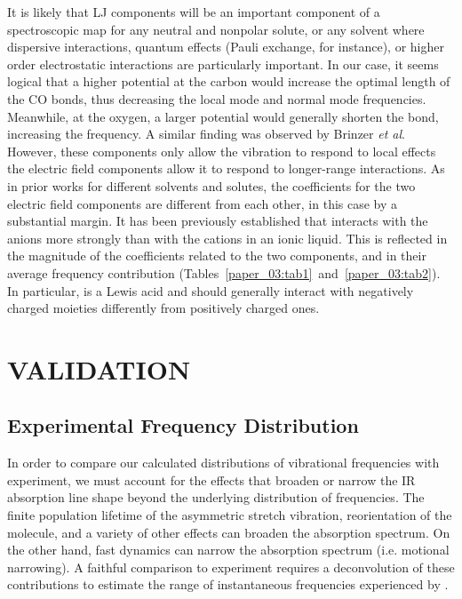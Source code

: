 \documentclass[%
  class = book,%
  crop = false,%
  float = true,%
  multi = true,%
  preview = false,%
]{standalone}
\newcommand{\caps}[1]{\uppercase{#1}}
\begin{document}
It is likely that LJ components will be an important component of a spectroscopic map for any neutral and nonpolar solute, or any solvent where dispersive interactions, quantum effects (Pauli exchange, for instance), or higher order electrostatic interactions are particularly important. In our case, it seems logical that a higher potential at the carbon would increase the optimal length of the CO bonds, thus decreasing the local mode and normal mode frequencies. Meanwhile, at the oxygen, a larger potential would generally shorten the bond, increasing the frequency. A similar finding was observed by Brinzer \emph{et al}.\cite{Brinzer2015} However, these components only allow the  vibration to respond to local effects \textemdash{} the electric field components allow it to respond to longer-range interactions. As in prior works for different solvents and solutes, the coefficients for the two electric field components are different from each other, in this case by a substantial margin. It has been previously established that  interacts with the anions more strongly than with the cations in an ionic liquid.\cite{Cadena2004,akiJPCB-04,anthonyJPCB-05,Muldoon2007a,houIECR-07,ramdinIECR-12} This is reflected in the magnitude of the coefficients related to the two components, and in their average frequency contribution (Tables~\ref{paper_03:tab1}~and~\ref{paper_03:tab2}). In particular,  is a Lewis acid and should generally interact with negatively charged moieties differently from positively charged ones.

\section{\texorpdfstring{\caps{Validation}}{Validation}}
\label{paper_03:sec:V}

\subsection{Experimental Frequency Distribution}
\label{paper_03:ssec:V-A}

In order to compare our calculated distributions of  vibrational frequencies with experiment, we must account for the effects that broaden or narrow the IR absorption line shape beyond the underlying distribution of frequencies. The finite population lifetime of the asymmetric stretch vibration, reorientation of the  molecule, and a variety of other effects can broaden the absorption spectrum. On the other hand, fast dynamics can narrow the absorption spectrum (i.e. motional narrowing). A faithful comparison to experiment requires a deconvolution of these contributions to estimate the range of instantaneous frequencies experienced by .
\end{document}
